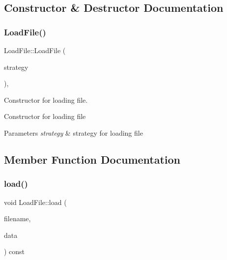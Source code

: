 \subsection{Constructor \& Destructor Documentation}
\mbox{\label{classLoadFile_a0bab5fb647b94041305923651ac42c28}} 
\subsubsection{\texorpdfstring{LoadFile()}{LoadFile()}}
{\footnotesize\ttfamily Load\+File\+::\+Load\+File (\begin{DoxyParamCaption}\item[{\mbox{\hyperlink{classLoadInterface}{Load\+Interface}} $\ast$}]{strategy }\end{DoxyParamCaption})\hspace{0.3cm}{\ttfamily [inline]}, {\ttfamily [explicit]}}



Constructor for loading file. 

Constructor for loading file 
\begin{DoxyParams}{Parameters}
{\em strategy} & strategy for loading file \\
\hline
\end{DoxyParams}


\subsection{Member Function Documentation}
\mbox{\label{classLoadFile_a02d94c2968496d097349ebc70f08f0ee}} 
\subsubsection{\texorpdfstring{load()}{load()}}
{\footnotesize\ttfamily void Load\+File\+::load (\begin{DoxyParamCaption}\item[{std\+::string}]{filename,  }\item[{\mbox{\hyperlink{classFileDataContainer}{File\+Data\+Container}} $\ast$}]{data }\end{DoxyParamCaption}) const\hspace{0.3cm}{\ttfamily [inline]}}



